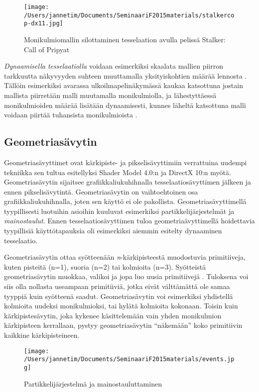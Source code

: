 \documentclass[finnish]{tktltiki2}
\theoremstyle{definition}
\theoremstyle{remark}
\begin{document}
\begin{figure}[!htbp]
\texttt{[image: /Users/jannetim/Documents/SeminaariF2015materials/stalkercop-dx11.jpg]}
\caption{Monikulmiomallin silottaminen tesselaation avulla pelissä Stalker: Call of Pripyat}
\label{SCoP}
\end{figure}

\emph{Dynaamisella tesselaatiolla} voidaan esimerkiksi skaalata mallien piirron tarkkuutta näkyvyyden suhteen muuttamalla yksityiskohtien määrää lennosta \cite{Nvi10}. Tällöin esimerkiksi avarassa ulkoilmapelinäkymässä kaukaa katsottuna jostain mallista piirretään malli muutamalla monikulmiolla, ja lähestyttäessä monikulmioiden määrää lisätään dynaamisesti, kunnes läheltä katsottuna malli voidaan piirtää tuhansista monikulmioista \cite{Gre14}.

\subsection{Geometriasävytin}

Geometriasävyttimet ovat kärkipiste- ja pikselisävyttimiin verrattuina uudempi tekniikka sen tultua esitellyksi Shader Model 4.0:n ja DirectX 10:n myötä. Geometriasävytin sijaitsee grafiikkaliukuhihnalla tesselaatiosävyttimen jälkeen ja ennen pikselisävytintä. Geometriasävytin on vaihtoehtoinen osa grafiikkaliukuhihnalla, joten sen käyttö ei ole pakollista. Geometriasävyttimellä tyypillisesti luotuihin asioihin kuuluvat esimerkiksi partikkelijärjestelmät ja \emph{mainostaulut}. Ennen tesselaatiosävyttimen tuloa geometriaävyttimellä hoidettavia tyypillisiä käyttötapauksia oli esimerkiksi aiemmin esitelty dynaaminen tesselaatio.

Geometriasävytin ottaa syötteenään \emph{n}-kärkipisteestä muodostuvia primitiiveja, kuten pisteitä (n=1), suoria (n=2) tai kolmioita (n=3). Syötteistä geometriasävytin muokkaa, valikoi ja jopa luo uusia primitiivejä \cite{Gre14}. Tuloksena voi siis olla nollasta useampaan primitiiviä, jotka eivät välttämättä ole samaa tyyppiä kuin syötteenä saadut. Geometriasävytin voi esimerkiksi yhdistellä kolmioita uudeksi monikulmioksi, tai hylätä kolmioita kokonaan. Toisin kuin kärkipistesävytin, joka kykenee käsittelemään vain yhden monikulmion kärkipisteen kerrallaan, pystyy geometriasävytin ``näkemään'' koko primitiivin kaikkine kärkipisteineen.

\begin{figure}[!htbp]
\texttt{[image: /Users/jannetim/Documents/SeminaariF2015materials/events.jpg]}
\caption{Partikkelijärjestelmä ja mainostauluttaminen}
\label{billboard}
\end{figure}
\end{document}
